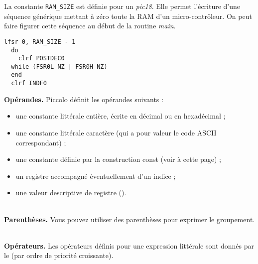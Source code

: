 La constante \texttt{RAM\_SIZE} est définie pour un \emph{pic18}. Elle permet l'écriture d'une séquence générique mettant à zéro toute la RAM d'un micro-contrôleur. On peut faire figurer cette séquence au début de la routine \emph{main}.


\begin{lstlisting}[language=piccolo]
  lfsr 0, RAM_SIZE - 1
  do
    clrf POSTDEC0
  while (FSR0L NZ | FSR0H NZ)
  end
  clrf INDF0
\end{lstlisting}



\textbf{Opérandes.} Piccolo définit les opérandes suivants :
\begin{itemize}
  \item une constante littérale entière, écrite en décimal ou en hexadécimal ;
  \item une constante littérale caractère (qui a pour valeur le code ASCII correspondant) ;
  \item une constante définie par la construction const (voir à cette page) ;
  \item un registre accompagné éventuellement d’un indice ;
  \item une valeur descriptive de registre ().
\end{itemize}

~\\
\textbf{Parenthèses.} Vous pouvez utiliser des parenthèses pour exprimer le groupement.

~\\
\textbf{Opérateurs.} Les opérateurs définis pour une expression littérale sont donnés par le  (par ordre de priorité croissante).

